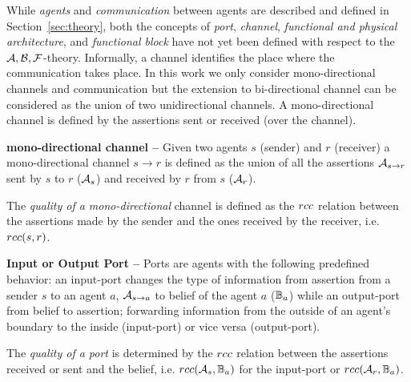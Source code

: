 While \emph{agents} and \emph{communication} between agents are described and
defined in Section~\ref{sec:theory}, both the concepts of \emph{port},
\emph{channel}, \emph{functional and physical architecture}, and
\emph{functional block} have not yet been defined with respect to the
$\mathcal{A},\mathcal{B},\mathcal{F}$-theory.  Informally, a channel identifies the place where the
communication takes place.  In this work we only consider mono-directional
channels and communication but the extension to bi-directional channel can be
considered as the union of two unidirectional channels. A mono-directional
channel is defined by the assertions sent or received (over the channel). 

\begin{definition}{\bf mono-directional channel --}\label{def:monochannel}
	Given two agents $s$ (sender) and $r$ (receiver) a
	mono-directional channel $s \rightarrow r$ is defined as the union of all the assertions 
	$\rassert{s}{r}$ sent by $s$ to $r$ ($\mathcal{A}_s$) and received by $r$ from $s$ ($\mathcal{A}_r$). 
\end{definition}
The \emph{quality of a mono-directional} channel is defined as the 
$rcc$ relation between the assertions made by the sender and the ones received by the receiver, i.e. $rcc(s,r)$.

\begin{definition}{\bf Input or Output Port --}\label{def:port} 
	Ports are agents with the following predefined behavior: an input-port changes
	the type of information from assertion from a sender $s$ to an agent $a$,
	$\rassert{s}{a}$ to belief of the agent $a$ ($\mathbb{B}_a$) while an
	output-port from belief to assertion; forwarding information from the outside
	of an agent's boundary to the inside (input-port) or vice versa (output-port). 
\end{definition}
The \emph{quality of a port} is determined by the $rcc$ relation between the 
assertions received or sent and the belief, i.e. $rcc(\mathcal{A}_s,\mathbb{B}_a)$ for the input-port
or $rcc(\mathcal{A}_r,\mathbb{B}_a)$.

